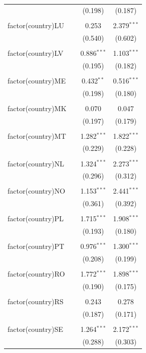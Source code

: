 \begin{table}[!htbp]
\begin{tabular}{@{\extracolsep{5pt}}lccc}
  &  & (0.198) & (0.187) \\ 
  & & & \\ 
 factor(country)LU &  & 0.253 & 2.379$^{***}$ \\ 
  &  & (0.540) & (0.602) \\ 
  & & & \\ 
 factor(country)LV &  & 0.886$^{***}$ & 1.103$^{***}$ \\ 
  &  & (0.195) & (0.182) \\ 
  & & & \\ 
 factor(country)ME &  & 0.432$^{**}$ & 0.516$^{***}$ \\ 
  &  & (0.198) & (0.180) \\ 
  & & & \\ 
 factor(country)MK &  & 0.070 & 0.047 \\ 
  &  & (0.197) & (0.179) \\ 
  & & & \\ 
 factor(country)MT &  & 1.282$^{***}$ & 1.822$^{***}$ \\ 
  &  & (0.229) & (0.228) \\ 
  & & & \\ 
 factor(country)NL &  & 1.324$^{***}$ & 2.273$^{***}$ \\ 
  &  & (0.296) & (0.312) \\ 
  & & & \\ 
 factor(country)NO &  & 1.153$^{***}$ & 2.441$^{***}$ \\ 
  &  & (0.361) & (0.392) \\ 
  & & & \\ 
 factor(country)PL &  & 1.715$^{***}$ & 1.908$^{***}$ \\ 
  &  & (0.193) & (0.180) \\ 
  & & & \\ 
 factor(country)PT &  & 0.976$^{***}$ & 1.300$^{***}$ \\ 
  &  & (0.208) & (0.199) \\ 
  & & & \\ 
 factor(country)RO &  & 1.772$^{***}$ & 1.898$^{***}$ \\ 
  &  & (0.190) & (0.175) \\ 
  & & & \\ 
 factor(country)RS &  & 0.243 & 0.278 \\ 
  &  & (0.187) & (0.171) \\ 
  & & & \\ 
 factor(country)SE &  & 1.264$^{***}$ & 2.172$^{***}$ \\ 
  &  & (0.288) & (0.303) \\ 

\end{tabular}
\end{table}
